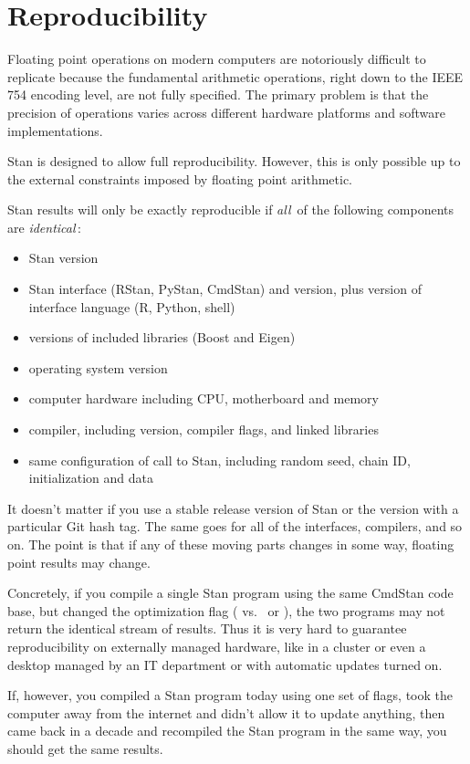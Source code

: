\chapter{Reproducibility}\label{reproducibility.chapter}

\noindent
Floating point operations on modern computers are notoriously
difficult to replicate because the fundamental arithmetic operations,
right down to the IEEE 754 encoding level, are not fully specified.
The primary problem is that the precision of operations varies across
different hardware platforms and software implementations.

Stan is designed to allow full reproducibility.  However, this is only
possible up to the external constraints imposed by floating point
arithmetic.

Stan results will only be exactly reproducible if {\it all}\, of the following
components are {\it identical}\,:
%
\begin{itemize}
\item Stan version
\item Stan interface (RStan, PyStan, CmdStan) and version, plus version
  of interface language (R, Python, shell)
\item versions of included libraries (Boost and Eigen)
\item operating system version
\item computer hardware including CPU, motherboard and memory
\item \Cpp compiler, including version, compiler flags, and linked libraries
\item same configuration of call to Stan, including random seed, chain
  ID, initialization and data
\end{itemize}
%
It doesn't matter if you use a stable release version of Stan or the
version with a particular Git hash tag.  The same goes for all of the
interfaces, compilers, and so on.  The point is that if any of
these moving parts changes in some way, floating point results may
change.

Concretely, if you compile a single Stan program using the same
CmdStan code base, but changed the optimization flag ( vs.\
 or ), the two programs may not return the identical
stream of results.  Thus it is very hard to guarantee reproducibility
on externally managed hardware, like in a cluster or even a desktop
managed by an IT department or with automatic updates turned on.

If, however, you compiled a Stan program today using one set of flags,
took the computer away from the internet and didn't allow it to update
anything, then came back in a decade and recompiled the Stan program
in the same way, you should get the same results.

